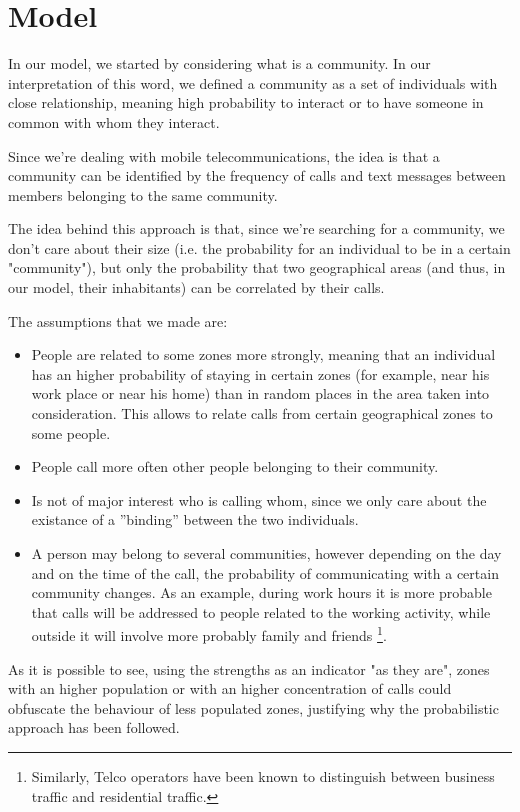 \section{Model}
In our model, we started by considering what is a community. In our interpretation of this word,
we defined a community as a set of individuals with close relationship, meaning high probability to interact or to have someone in common with whom they interact.

Since we're dealing with mobile telecommunications, the idea is that a community can be identified by the frequency of calls and text messages between members belonging
to the same community.

The idea behind this approach is that, since we're searching for a community, we don't care about their size (i.e. the probability for an individual to be in a certain "community"), 
but only the probability that two geographical areas (and thus, in our model, their inhabitants) can be correlated by their calls.

The assumptions that we made are:
\begin{itemize}
\item People are related to some zones more strongly, meaning that an individual 
has an higher probability of staying in certain zones (for example, near his work place or near his home) than in random places
in the area taken into consideration. This allows to relate calls from certain geographical zones to some people.
\item People call more often other people belonging to their community.
\item Is not of major interest who is calling whom, since we only care about the existance of a ''binding'' between the two individuals.
\item A person may belong to several communities, however depending on the day and on the time of the call, the probability of communicating with a certain community changes.
As an example, during work hours it is more probable that calls will be addressed to people related to the working activity, while outside it will involve more probably family and friends
\footnote{Similarly, Telco operators have been known to distinguish between business traffic and residential traffic.}.
\end{itemize}

As it is possible to see, using the strengths as an indicator "as they are", zones with an higher population or with an higher concentration of calls could obfuscate the behaviour of less populated zones, justifying why the probabilistic approach has been followed.


